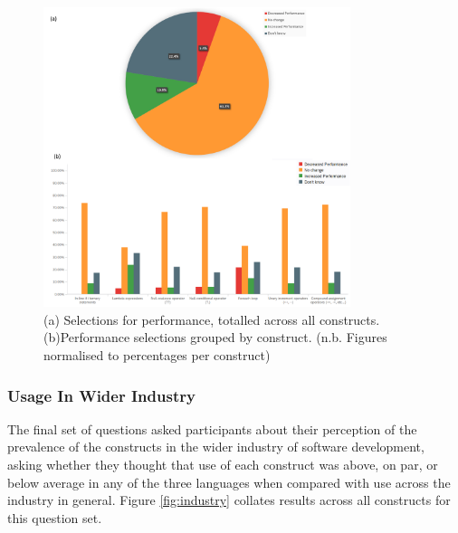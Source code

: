 \documentclass{article}
\begin{document}
            \begin{figure}[htbp]
                \centering
                \includegraphics[width=0.8\textwidth]{performance}
                \caption{(a) Selections for performance, totalled across all constructs.\newline(b)Performance selections grouped by construct. (n.b. Figures normalised to percentages per construct)}
                \label{fig:performance}
            \end{figure}   
        \subsubsection{Usage In Wider Industry}
            The final set of questions asked participants about their perception of the prevalence of the constructs in the wider industry of software development, asking whether they thought that use of each construct was above, on par, or below average in any of the three languages when compared with use across the industry in general. Figure \ref{fig:industry} collates results across all constructs for this question set.
\end{document}
